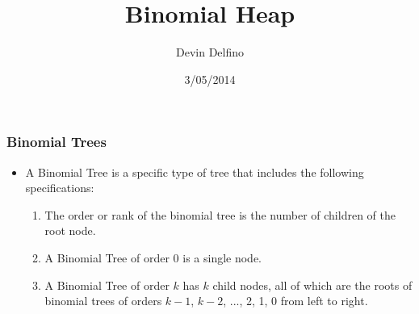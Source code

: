 \documentclass[13pt]{beamer}
\title{Binomial Heap}
\author{Devin Delfino}
\institute{Comp 401: Senior Seminar}
\date{3/05/2014}
\begin{document}
\frame{\titlepage}

\begin{frame}
\frametitle{Binomial Trees}
	\begin{itemize}
		\item A \alert{Binomial Tree} is a specific type of tree that includes the following specifications:
          \begin{enumerate}
            \item The \alert{order} or \alert{rank} of the binomial tree is the number of children of the root node.
            \item A Binomial Tree of order $0$ is a single node.
            \item A Binomial Tree of order $k$ has $k$ child nodes, all of which are the roots of binomial trees of orders $k - 1$, $k - 2$, ..., 2, 1, 0 from left to right.
          \end{enumerate}
	\end{itemize}
\end{frame}
\end{document}
